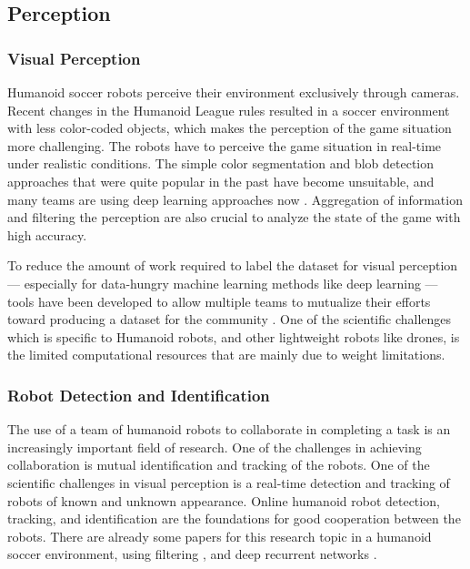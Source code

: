 \documentclass{article}
\begin{document}

\subsection{Perception}
\subsubsection{Visual Perception}
Humanoid soccer robots perceive their environment exclusively through cameras. 
Recent changes in the Humanoid League rules resulted in a soccer environment with less color-coded objects, which makes the perception of the game situation more challenging.
The robots have to perceive the game situation in real-time under realistic conditions.
The simple color segmentation and blob detection approaches that were quite popular in the past \cite{Farazi2015} have become unsuitable, and many teams are using deep learning approaches now \cite{ficht2018nimbro} \cite{schnekenburger2017detection}. 
Aggregation of information and filtering the perception are also crucial to analyze the state of the game with high accuracy.

To reduce the amount of work required to label the dataset for visual perception --- especially for data-hungry machine learning methods like deep learning --- tools have been developed to allow multiple teams to mutualize their efforts toward producing a dataset for the community \cite{imagetagger2018}.
One of the scientific challenges which is specific to Humanoid robots, and other lightweight robots like drones, is the limited computational resources that are mainly due to weight limitations. 




\subsubsection{Robot Detection and Identification}
The use of a team of humanoid robots to collaborate in completing a task is an increasingly important field of research. 
One of the challenges in achieving collaboration is mutual identification and tracking of the robots. One of the scientific challenges in visual perception is a real-time detection and tracking of robots of known and unknown appearance.
Online humanoid robot detection, tracking, and identification are the foundations for good cooperation between the robots. 
There are already some papers for this research topic in a humanoid soccer environment, using filtering \cite{farazi2016real}, and deep recurrent networks \cite{farazi2017online}.
\end{document}
